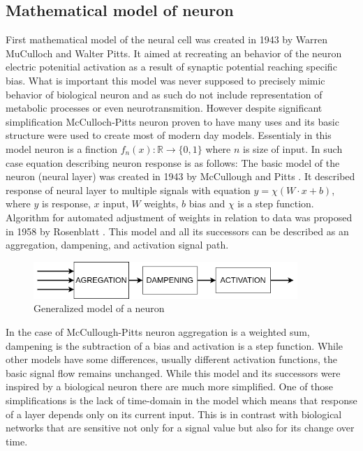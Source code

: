 \subsection{Mathematical model of neuron}
First mathematical model of the neural cell was created in 1943 by Warren MuCulloch and Walter Pitts.
It aimed at recreating an behavior of the neuron electric potenitial activation as a result of
synaptic potential reaching specific bias. What is important this model was never supposed to
precisely mimic behavior of biological neuron and as such do not include representation of metabolic
processes or even neurotransmition.
However despite significant simplification McCulloch-Pitts neuron proven to have many uses and
its basic structure were used to create most of modern day models.
Essentialy in this model neuron is a finction $f_n(x):\mathbb{R} \rightarrow \{ 0,1 \} $ where $n$
is size of input.
In such case equation describing neuron response is as follows:
The basic model of the neuron (neural layer) was created in 1943 by McCullough and Pitts 
\cite{McCulloch1943}. It described response of neural layer to multiple signals with
equation $y= \chi (W\cdot x+b)$, where $y$ is response, $x$ input, $W$ weights, $b$ bias and
$\chi$ is a step function.
Algorithm for automated adjustment of weights in relation to data was proposed in 1958
by Rosenblatt \cite{Rosenblatt58}. This model and all its successors can be described
as an aggregation, dampening, and activation signal path.
\begin{figure}[ht] 
	\centering
	\includegraphics[width=10cm]{res/basic_neuron}
	\caption{Generalized model of a neuron}
	\label{fig:basic_neuron}
\end{figure}
In the case of McCullough-Pitts neuron aggregation is a weighted sum, dampening is the subtraction
of a bias and activation is a step function. While other models have some differences,
usually different activation functions, the basic signal flow remains unchanged.
While this model and its successors were inspired by a biological neuron there are much
more simplified. One of those simplifications is the lack of time-domain in the model which means
that response of a layer depends only on its current input.
This is in contrast with biological networks that are sensitive not only for a signal value
but also for its change over time.

